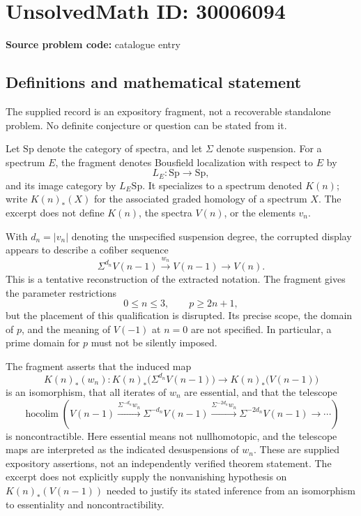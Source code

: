 \documentclass[11pt]{article}
\begin{document}
\section*{UnsolvedMath ID: 30006094}
\textbf{Source problem code:} catalogue entry
\subsection{Definitions and mathematical statement}
The supplied record is an expository fragment, not a recoverable standalone problem. No definite conjecture or question can be stated from it.

Let \(\mathrm{Sp}\) denote the category of spectra, and let \(\Sigma\) denote suspension. For a spectrum \(E\), the fragment denotes Bousfield localization with respect to \(E\) by
\[
L_E\colon \mathrm{Sp}\longrightarrow\mathrm{Sp},
\]
and its image category by \(L_E\mathrm{Sp}\). It specializes to a spectrum denoted \(K(n)\); write \(K(n)_*(X)\) for the associated graded homology of a spectrum \(X\). The excerpt does not define \(K(n)\), the spectra \(V(n)\), or the elements \(v_n\).

With \(d_n=|v_n|\) denoting the unspecified suspension degree, the corrupted display appears to describe a cofiber sequence
\[
\Sigma^{d_n}V(n-1)\xrightarrow{w_n}V(n-1)\longrightarrow V(n).
\]
This is a tentative reconstruction of the extracted notation. The fragment gives the parameter restrictions
\[
0\leq n\leq 3,\qquad p\geq 2n+1,
\]
but the placement of this qualification is disrupted. Its precise scope, the domain of \(p\), and the meaning of \(V(-1)\) at \(n=0\) are not specified. In particular, a prime domain for \(p\) must not be silently imposed.

The fragment asserts that the induced map
\[
K(n)_*(w_n)\colon K(n)_*\bigl(\Sigma^{d_n}V(n-1)\bigr)
\longrightarrow K(n)_*\bigl(V(n-1)\bigr)
\]
is an isomorphism, that all iterates of \(w_n\) are essential, and that the telescope
\[
\operatorname*{hocolim}\left(
V(n-1)
\xrightarrow{\Sigma^{-d_n}w_n}\Sigma^{-d_n}V(n-1)
\xrightarrow{\Sigma^{-2d_n}w_n}\Sigma^{-2d_n}V(n-1)
\longrightarrow\cdots
\right)
\]
is noncontractible. Here essential means not nullhomotopic, and the telescope maps are interpreted as the indicated desuspensions of \(w_n\). These are supplied expository assertions, not an independently verified theorem statement. The excerpt does not explicitly supply the nonvanishing hypothesis on \(K(n)_*(V(n-1))\) needed to justify its stated inference from an isomorphism to essentiality and noncontractibility.
\end{document}
